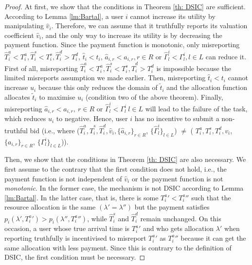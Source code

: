 \documentclass[11pt]{phdthesis}
\begin{document}
\begin{proof}
  At first, we show that the conditions in Theorem \ref{th: DSIC} are sufficient. According to Lemma \ref{lm:Bartal}, a user $ i $ cannot increase its utility by manipulating $\hat{v}_i$. Therefore, we can assume that it truthfully reports its valuation coefficient $\hat{v}_i$, and the only way to increase its utility is by decreasing the payment function. Since the payment function is monotonic, only misreporting $\hat{T}_i^a < T_i^a, \hat{T}_i^s < T_i^s, \hat{T}_i^d > T_i^d$, $ \hat{t}_i < t_i $, $ \hat{a}_{i,r}  <  a_{i,r}, r \in R  $ or $   \hat{\Gamma}_l^i  <  \Gamma_l^i , l \in L  $ can reduce it. First of all, misreporting $\hat{T}_i^a < T_i^a, \hat{T}_i^s < T_i^s, \hat{T}_i^d > T_i^d$ is impossible because the limited misreports assumption we made earlier. Then, misreporting $ \hat{t}_i < t_i $ cannot increase $ u_i $ because this only reduces the domain of $\tilde{t}_i$ and the allocation function allocates $\tilde{t}_i$ to maximise $u_i$ (condition two of the above theorem). Finally, misreporting $ \hat{a}_{i,r}  <  a_{i,r} ,\ r \in R  $ or $   \hat{\Gamma}_l^i  <  \Gamma_l^i \  l \in L  $ will lead to the failure of the task, which reduces $ u_i $ to negative. Hence, user $ i $ has no incentive to submit a non-truthful bid (i.e., where ($\hat{T}_i^a,\hat{T}_i^s,\hat{T}_i^d, \hat{v}_i, \{ \hat{a}_{i,r} \}_{r \in R} $, $ \{ \hat{\Gamma}_l^i \}_{l \in L} $) $ \neq $ ( $T_i^a, T_i^s, T_i^d, v_i $, $ \{ a_{i,r} \}_{r \in R} $, $ \{ \Gamma_l^i \}_{l \in L} $)).
    
    Then, we show that the conditions in Theorem \ref{th: DSIC} are also necessary. We first assume to the contrary that the first condition does not hold, i.e., the payment function is not independent of $\hat{v}_i$ or the payment function is not \textit{monotonic}. In the former case, the mechanism is not DSIC according to Lemma \ref{lm:Bartal}. In the latter case, that is, there is some ${T_i^a}' < {T_i^a}''$ such that the resource allocation is the same $( \lambda' = \lambda'' )$ but the payment satisfies $p_i(\lambda', {T_i^a}') > p_i(\lambda'', {T_i^a}'')$, while $\hat{T}_i^s$ and $\hat{T}_i^d$ remain unchanged. On this occasion, a user whose true arrival time is ${T_i^a}'$ and who gets allocation $ \lambda' $ when reporting truthfully is incentivised to misreport ${T_i^a}'$ as ${T_i^a}''$ because it can get the same allocation with less payment. Since this is contrary to the definition of DSIC, the first condition must be necessary.
    

\end{proof}
\end{document}
